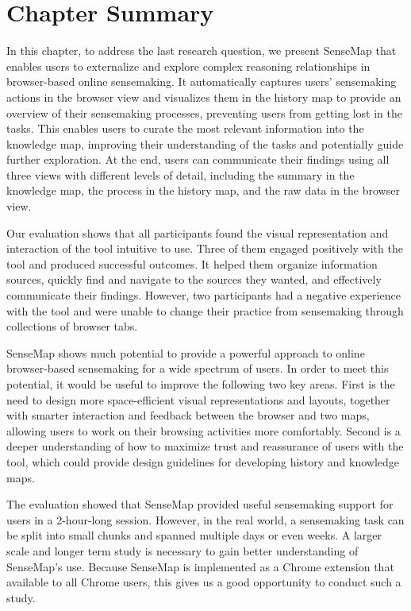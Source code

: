 \section{Chapter Summary}
In this chapter, to address the last research question, we present SenseMap that enables users to externalize and explore complex reasoning relationships in browser-based online sensemaking. It automatically captures users' sensemaking actions in the browser view and visualizes them in the history map to provide an overview of their sensemaking processes, preventing users from getting lost in the tasks. This enables users to curate the most relevant information into the knowledge map, improving their understanding of the tasks and potentially guide further exploration. At the end, users can communicate their findings using all three views with different levels of detail, including the summary in the knowledge map, the process in the history map, and the raw data in the browser view.

Our evaluation shows that all participants found the visual representation and interaction of the tool intuitive to use. Three of them engaged positively with the tool and produced successful outcomes. It helped them organize information sources, quickly find and navigate to the sources they wanted, and effectively communicate their findings. However, two participants had a negative experience with the tool and were unable to change their practice from sensemaking through collections of browser tabs.

SenseMap shows much potential to provide a powerful approach to online browser-based sensemaking for a wide spectrum of users. In order to meet this potential, it would be useful to improve the following two key areas. First is the need to design more space-efficient visual representations and layouts, together with smarter interaction and feedback between the browser and two maps, allowing users to work on their browsing activities more comfortably. Second is a deeper understanding of how to maximize trust and reassurance of users with the tool, which could provide design guidelines for developing history and knowledge maps.

The evaluation showed that SenseMap provided useful sensemaking support for users in a 2-hour-long session. However, in the real world, a sensemaking task can be split into small chunks and spanned multiple days or even weeks. A larger scale and longer term study is necessary to gain better understanding of SenseMap's use. Because SenseMap is implemented as a Chrome extension that available to all Chrome users, this gives us a good opportunity to conduct such a study.